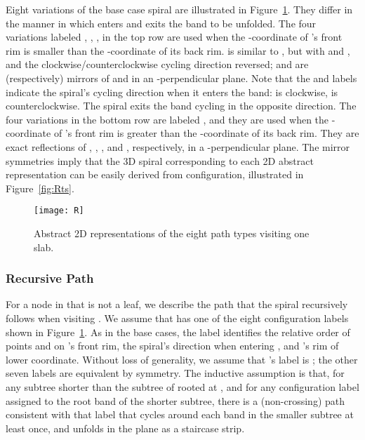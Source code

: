\documentclass[11pt]{article}
\begin{document}
Eight variations of the base case spiral are illustrated in Figure~\ref{fig:R}.
They differ in the manner in which  enters and exits the band  to be unfolded.
The four variations labeled , , ,  in the top row are
used when the -coordinate of 's front rim is smaller than the -coordinate of its back rim.  is similar to , but with  and , and the clockwise/counterclockwise
cycling direction reversed;  and  are (respectively) mirrors of
 and  in an -perpendicular plane. Note that the  and  labels indicate
the spiral's cycling direction when it enters the band:  is clockwise,
 is counterclockwise. The spiral exits the band cycling in the opposite direction.
The four variations in the bottom row
are labeled , and they are
used when
the -coordinate of 's front rim is greater than the -coordinate
of its back rim.
They are exact reflections of , , , and , respectively, in
a -perpendicular plane.
The mirror symmetries imply that the 3D spiral corresponding to each 2D
abstract representation can be easily derived from  configuration, illustrated in Figure~\ref{fig:Rts}.
\begin{figure}[htbp]
\centering
\texttt{[image: R]}
\caption{Abstract 2D representations of the eight path types visiting one slab.}
\label{fig:R}
\end{figure}




\subsubsection{Recursive Path}
\label{sec:eps-recursive}

For a node  in  that is not a leaf, we describe the path that the spiral 
recursively follows when visiting .
We assume that  has one of the eight configuration
labels shown in Figure~\ref{fig:R}.
As in the base cases, the label
identifies the relative order of points  and  on 's front rim, the spiral's direction
when entering , and 's rim of lower  coordinate.
Without loss of generality, we assume that
's label is ; the other seven labels are equivalent by symmetry.
The inductive assumption is
that, for any subtree shorter than the subtree of  rooted at , and for
any configuration label assigned to the root band of the shorter subtree,
there is a (non-crossing) path  consistent with that label
that cycles around each band in the smaller subtree at least once,
and unfolds in the plane as a staircase strip.
\end{document}
